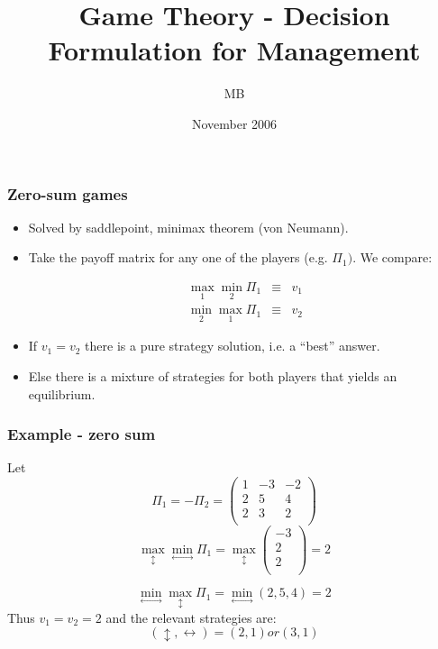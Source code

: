 \documentclass{beamer}
\title[Game Theory...] %
{Game Theory - Decision Formulation for Management}
\author[] %
{MB}
\institute[Oslo University College] %
{
  Department of Computer Science\\
  Oslo Univeristy College
}
\date[MS007A] %
{November 2006}
\def\beq{\begin{eqnarray}}
\def\eeq{\end{eqnarray}}
\begin{document}
\begin{frame}
  \titlepage
\end{frame}


\begin{frame}
\frametitle{Zero-sum games}

\begin{itemize}
\item Solved by saddlepoint, minimax theorem (von Neumann).

\item Take the payoff matrix for any one of the players (e.g. $\Pi_1)$.
We compare:

\beq
\max_1\min_2 \Pi_1 &\equiv& v_1\\
\min_2\max_1 \Pi_1 &\equiv& v_2
\eeq

\item If $v_1 = v_2$ there is a pure strategy solution, i.e.
a ``best'' answer. 

\item Else there is a mixture of strategies for
both players that yields an equilibrium.

\end{itemize}

\end{frame}


\begin{frame}
\frametitle{Example - zero sum}

Let
$$
\Pi_1 = - \Pi_2 = \left(
\begin{array}{ccc}
1 & -3 & -2\\
2 & 5 & 4\\
2 & 3 & 2\\
\end{array}
\right)
$$
$$
\max_\updownarrow\min_\leftrightarrow \Pi_1 = \max_\updownarrow \left(
\begin{array}{c}
-3\\
2\\
2\\
\end{array}
\right) = 2
$$

$$
\min_\leftrightarrow \max_\updownarrow\Pi_1 = \min_\leftrightarrow (2,5,4) = 2
$$
Thus $v_1=v_2=2$ and the relevant strategies are: 
$$(\updownarrow,\leftrightarrow) =(2,1) or (3,1)$$
\end{frame}
\end{document}
